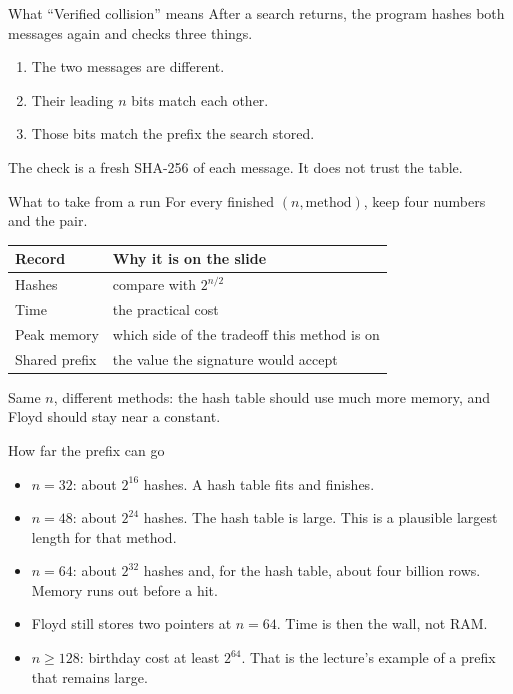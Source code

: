 \documentclass[aspectratio=169,11pt]{beamer}
\begin{document}
\begin{frame}{What ``Verified collision'' means}
  After a search returns, the program hashes both messages again and checks three things.
  \begin{enumerate}
    \item The two messages are different.
    \item Their leading \(n\) bits match each other.
    \item Those bits match the prefix the search stored.
  \end{enumerate}
  \vspace{0.5em}
  The check is a fresh SHA-256 of each message. It does not trust the table.
\end{frame}

\begin{frame}{What to take from a run}
  For every finished \((n, \text{method})\), keep four numbers and the pair.
  \begin{center}
  \begin{tabular}{@{}ll@{}}
    \toprule
    Record & Why it is on the slide \\
    \midrule
    Hashes & compare with \(2^{n/2}\) \\
    Time & the practical cost \\
    Peak memory & which side of the tradeoff this method is on \\
    Shared prefix & the value the signature would accept \\
    \bottomrule
  \end{tabular}
  \end{center}
  \vspace{0.4em}
  Same \(n\), different methods: the hash table should use much more memory, and Floyd should stay near a constant.
\end{frame}

\begin{frame}{How far the prefix can go}
  \begin{itemize}
    \item \(n = 32\): about \(2^{16}\) hashes. A hash table fits and finishes.
    \item \(n = 48\): about \(2^{24}\) hashes. The hash table is large. This is a plausible largest length for that method.
    \item \(n = 64\): about \(2^{32}\) hashes and, for the hash table, about four billion rows. Memory runs out before a hit.
    \item Floyd still stores two pointers at \(n = 64\). Time is then the wall, not RAM.
    \item \(n \ge 128\): birthday cost at least \(2^{64}\). That is the lecture's example of a prefix that remains large.
  \end{itemize}
\end{frame}
\end{document}
